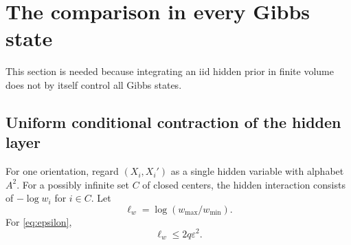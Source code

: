 \section{The comparison in every Gibbs state}\label{sec:allstates}

This section is needed because integrating an iid hidden prior in finite volume does not by itself control all Gibbs states.

\subsection{Uniform conditional contraction of the hidden layer}

For one orientation, regard \((X_i,X_i')\) as a single hidden variable with alphabet \(A^2\). For a possibly infinite set \(C\) of closed centers, the hidden interaction consists of \(-\log w_i\) for \(i\in C\). Let
\begin{equation}
 \ell_w=\log(w_{\max}/w_{\min}).
\end{equation}
For \eqref{eq:epsilon},
\begin{equation}
 \ell_w\le2q\varepsilon^2.
 \label{eq:logosc}
\end{equation}

